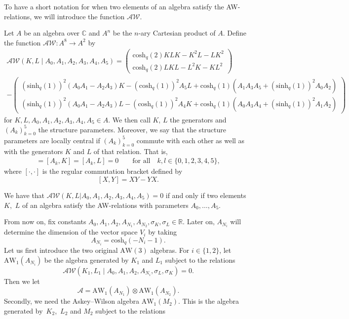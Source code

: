 \documentclass[pdftex]{sigma}
\numberwithin{equation}{section}
\newcommand{\RR}{\mathbb{R}}
\newcommand{\CC}{\mathbb{C}}
\newcommand{\aw}{\mathrm{AW}\!\left(3\right)}
\newcommand{\awc}[2]{\mathrm{AW}_{#1}\!\left(#2\right)}
\newcommand{\awr}{\mathscr{A}\!\!\mathscr{W}}
\newcommand{\chq}{\mathrm{cosh}_q}
\newcommand{\shq}{\mathrm{sinh}_q}
\begin{document}
To have a short notation for when two elements of an algebra satisfy the AW-relations, we will introduce the function $\awr$.
\begin{Definition}
	Let $A$ be an algebra over $\CC$ and $A^{ n}$ be the $n$-ary Cartesian product of $A$. Define the function $\awr\colon A^{8}\to A^{2}$ by
	\begin{gather*}
		\awr(K,L\mid A_0,A_1,A_2,A_3,A_4,A_5)=\left(\begin{matrix}\chq(2) KLK - K^2L -LK^2 \\ \chq(2)LKL - L^2K -KL^2 \end{matrix}\right) \\
		-\left(\begin{matrix}	(\shq(1))^2(A_0A_1\! -\!A_2A_3)K \!-\! (\chq(1))^2A_5L \!+\! \chq(1)(A_1A_3A_5\!+\!(\shq(1))^2A_0A_2)		\\ (\shq(1))^2(A_0A_1\! -\!A_2A_3)L \!-\!(\chq(1))^2A_4K \!+\!\chq(1)(A_0A_3A_4\!+\!(\shq(1))^2A_1A_2) \end{matrix}\right)
	\end{gather*}
	for $K,L,A_0,A_1,A_2,A_3,A_4,A_5\in A$. We then call $K$, $L$ the generators and $(A_k)_{k=0}^5$ the structure parameters. Moreover, we say that the structure parameters are locally central if $(A_k)_{k=0}^5$ commute with each other as well as with the generators $K$ and $L$ of that relation. That is,
	\begin{gather*}
		[A_k,A_l]=[A_k,K]=[A_k,L]=0 \qquad \text{for all} \quad k,l\in\{0,1,2,3,4,5\},
	\end{gather*}
	where $[\cdot,\cdot]$ is the regular commutation bracket defined by
	\[
	[X,Y]=XY-YX.
	\]
\end{Definition}
\begin{Remark}
	We have that $\awr(K,L|A_0,A_1,A_2,A_3,A_4,A_5)=0$ if and only if two elements $K$,~$L$ of an algebra satisfy the AW-relations with parameters $A_0,\dots, A_5$.
\end{Remark}
From now on, fix constants $A_0,A_1,A_2,A_{N_1},A_{N_2},\sigma_K,\sigma_L\in\RR$. Later on, $A_{N_i}$ will determine the dimension of the vector space $V_i$ by taking
\[
A_{N_i}=\chq(-N_i-1).
\]
Let us first introduce the two original $\aw$ algebras. For $i\in\{1,2\}$, let $\awc{1}{A_{N_i}}$ be the algebra generated by $K_1$ and $L_1$ subject to the relations
\[
\awr(K_1,L_1\mid A_0,A_1,A_2,A_{N_i},\sigma_L,\sigma_K)=0.
\]
Then we let
\[
\mathscr{A}=\awc{1}{A_{N_1}}\otimes\awc{1}{A_{N_2}}.
\]
Secondly, we need the Askey--Wilson algebra $\awc{1}{M_2}$. This is the algebra generated by~$K_2$,~$L_2$ and $M_2$ subject to the relations
\end{document}
